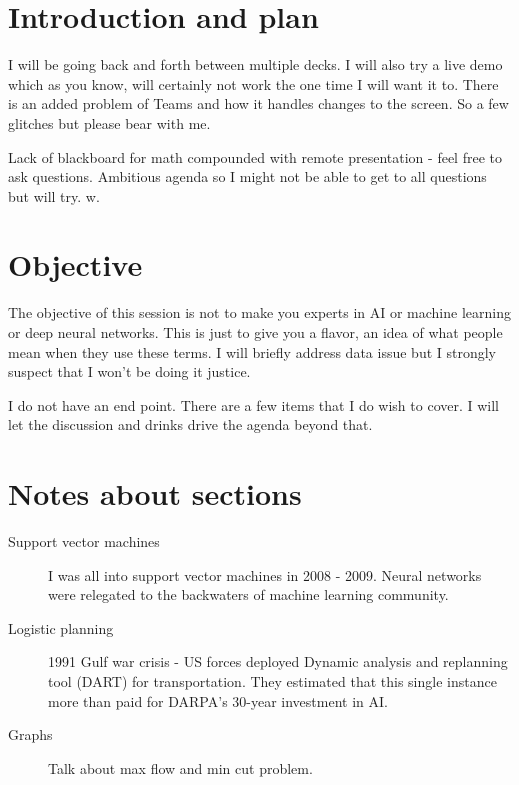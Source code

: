 \documentclass[14pt, twocolumn]{article}
\title{}
\author{}
\begin{document}
\maketitle


\section*{Introduction and plan}

I will be going back and forth between multiple decks. I will also try a live demo 
which as you know, will certainly not work the one time I will want it to. There is an added problem of 
Teams and how it handles changes to the screen. So a few glitches but please bear with me. 


Lack of blackboard for math compounded with remote presentation - feel free to ask 
	questions. Ambitious agenda so I might not be able to get to all questions but will try. w.


\section*{Objective}
The objective of this session is not to make you experts in AI or machine learning or deep neural 
networks. This is just to give you a flavor, an idea of what people mean when they use these terms. 
I will briefly address data issue but I strongly suspect that I won't be doing it justice. 

I do not have an end point. There are a few items that I do wish to cover. I will let the discussion and drinks drive the agenda beyond that. 

\section*{Notes about sections}
\begin{description}
	\item[Support vector machines] I was all into support vector machines in 2008 - 2009. Neural networks were 
	relegated to the backwaters of machine learning community. 
	\item[Logistic planning] 1991 Gulf war crisis - US forces deployed Dynamic analysis and replanning tool (DART) 
	for transportation. They estimated that this single instance more than paid for DARPA's 30-year investment in 
	AI. 
	\item[Graphs] Talk about max flow and min cut problem.
\end{description}
\end{document}
